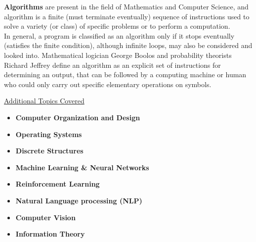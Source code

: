 \documentclass[10pt]{article}
\begin{document}
\textbf{Algorithms} are present in the field of Mathematics and Computer Science, and algorithm is a finite (must terminate eventually) sequence 
of instructions used to solve a variety (or class) of specific problems or to perform a computation. \\

In general, a program is classified as an algorithm only if it stops eventually (satisfies the finite condition), although infinite loops, may also be considered and looked into. Mathematical logician 
George Boolos and probability theorists Richard Jeffrey define an algorithm as an explicit set of instructions for determining an output, that can be followed by a computing machine 
or human who could only carry out specific elementary operations on symbols. 

\underline{Additional Topics Covered}
\begin{itemize}
    \item \textbf{Computer Organization and Design } \\
    \item \textbf{Operating Systems}
    \item \textbf{Discrete Structures}
    \item \textbf{Machine Learning \& Neural Networks }
    \item \textbf{Reinforcement Learning }
    \item \textbf{Natural Language processing (NLP)}
    \item \textbf{Computer Vision }
    \item \textbf{Information Theory}
\end{itemize}

\newpage
\end{document}
